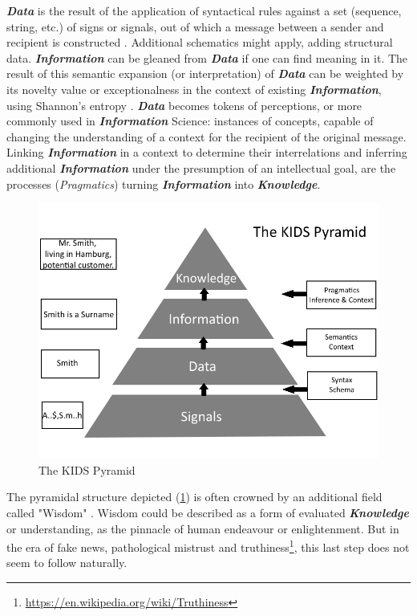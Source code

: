 \documentclass[a4paper,english,twoside,BCOR1.5cm,headsepline,DIV12,appendixprefix,final,12pt]{scrbook}
\newcommand{\important}[1]{\textbf{\textit{#1}}}
\newcommand\footnoteurl[1]{\footnote{\scriptsize\url{#1}}}
\begin{document}
\important{Data} is the result of the application of syntactical rules against a set (sequence, string, etc.) of signs or signals, out of which a message between a sender and recipient is constructed \cite{bodendorf2003daten}. Additional schematics might apply, adding structural data. \important{Information} can be gleaned from \important{Data} if one can find meaning in it. The result of this semantic expansion (or interpretation) of \important{Data} can be weighted by its novelty value or exceptionalness in the context of existing \important{Information}, using Shannon's entropy \cite{shannon48}. \important{Data} becomes tokens of perceptions, or more commonly used in \important{Information} Science: instances of concepts, capable of changing the understanding of a context for the recipient of the original message. Linking \important{Information} in a context to determine their interrelations and inferring additional \important{Information} under the presumption of an intellectual goal, are the processes (\textit{Pragmatics}) turning \important{Information} into \important{Knowledge}.

\begin{figure}[t]
\centering
  \includegraphics[width=\textwidth]{images/kidsPyramid.png}
  \caption{The KIDS Pyramid \cite{bodendorf2003daten}}
  \label{fig:kids}
\end{figure}

The pyramidal structure depicted (\cref{fig:kids}) is often crowned by an additional field called "Wisdom" \cite{Rowley2007}. Wisdom could be described as a form of evaluated \important{Knowledge} or understanding, as the pinnacle of human endeavour or enlightenment. But in the era of fake news, pathological mistrust and truthiness\footnoteurl{https://en.wikipedia.org/wiki/Truthiness}, this last step does not seem to follow naturally.
\end{document}
